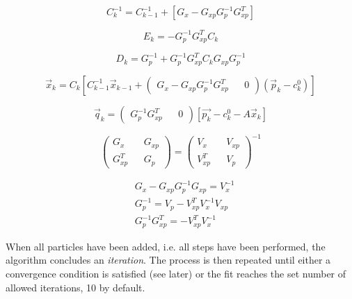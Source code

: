\begin{equation}
C_k^{-1} = C_{k-1}^{-1} + \left[
	G_x - G_{xp}G_p^{-1}G_{xp}^T
\right]
\end{equation}

\begin{equation}
E_k = -G_p^{-1} G_{xp}^T C_k
\end{equation}

\begin{equation}
D_k = G_p^{-1} + G_p^{-1} G_{xp}^T C_k G_{xp} G_p^{-1}
\end{equation}

\begin{equation}
\vec{x}_k = C_k \left[
	C_{k-1}^{-1} \vec{x}_{k-1}
	+ \begin{pmatrix}
		G_x - G_{xp} G_p^{-1} G_{xp}^T && 0
	\end{pmatrix}
	\left(
		\vec{p}_k - c_k^0
	\right)
\right]
\end{equation}

\begin{equation}
\vec{q}_k = \begin{pmatrix}
	G_p^{-1} G_{xp}^T && 0
\end{pmatrix}
\left[
	\vec{p_k} - c_k^0 - A\vec{x}_k
\right]
\end{equation}

\begin{equation}
\begin{pmatrix}
	G_x && G_{xp} \\
	G_{xp}^T && G_p
\end{pmatrix}
=
\begin{pmatrix}
	V_x && V_{xp} \\
	V_{xp}^T && V_p
\end{pmatrix}^{-1}
\end{equation}

\begin{subequations}
\begin{align}
&G_x - G_{xp} G_p^{-1} G_{xp} 	= V_x^{-1} \\
&G_p^{-1} 						= V_p - V_{xp}^T V_x^{-1} V_{xp} \\
&G_p^{-1} G_{xp}^T 				= -V_{xp}^T V_x^{-1}
\end{align}
\end{subequations}

When all particles have been added, i.e. all steps have been performed, the algorithm concludes an \textit{iteration}.
The process is then repeated until either a convergence condition is satisfied (see later) or the fit reaches the set number of allowed iterations, 10 by default.

